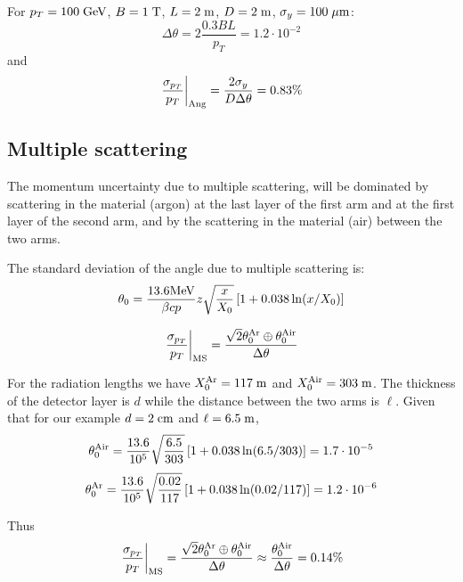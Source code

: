 \documentclass[a4paper,11pt,twoside]{article}
\begin{document}
For $p_T=100\;{\rm GeV}$, $B=1\;{\rm T}$, $L=2\;{\rm m}$, $D=2\;{\rm m}$, $\sigma_y=100\;{\rm \mu m}$:
\begin{equation}
  \Delta\theta = 2\frac{0.3BL}{p_T}=1.2\cdot 10^{-2}
\end{equation}
and
\begin{equation}
  \left.\frac{\sigma_{p_T}}{p_T}\right|_{\rm Ang}= \frac{2\sigma_y}{D\Delta\theta}=0.83\%
\end{equation}

\subsection{Multiple scattering}
The momentum uncertainty due to multiple scattering, will be dominated
by scattering in the material (argon) at the last layer of the first
arm and at the first layer of the second arm, and by the scattering in
the material (air) between the two arms.

The standard deviation of the angle due to multiple scattering is:
\begin{equation}
  \theta_0 = \frac{13.6{\rm MeV}}{\beta c p}z\sqrt{\frac{x}{X_0}}\left[1+0.038\ln(x/X_0)\right]
\end{equation}

\begin{equation}
  \left.\frac{\sigma_{p_T}}{p_T}\right|_{\rm MS}= \frac{\sqrt{2}\theta^{\rm Ar}_0\oplus \theta^{\rm Air}_0}{\Delta\theta}
\end{equation}



For the radiation lengths we have $X_0^{\rm Ar}=117\;{\rm m}$ and $X_0^{\rm Air}=303\;{\rm m}$.
The thickness of the detector layer is $d$ while the distance between the two arms is $\ell$.
Given that for our example $d=2\;{\rm cm}$ and $\ell=6.5\;{\rm m}$,
\begin{equation}
\theta^{\rm Air}_{0} = \frac{13.6}{10^5}\sqrt{\frac{6.5}{303}}\left[1+0.038\ln(6.5/303)\right]=  1.7\cdot 10^{-5}
\end{equation}
\begin{equation}
\theta^{\rm Ar}_{0} = \frac{13.6}{10^5}\sqrt{\frac{0.02}{117}}\left[1+0.038\ln(0.02/117)\right]=  1.2\cdot 10^{-6}
\end{equation}

Thus
\begin{equation}
  \left.\frac{\sigma_{p_T}}{p_T}\right|_{\rm MS}= \frac{\sqrt{2}\theta^{\rm Ar}_0\oplus \theta^{\rm Air}_0}{\Delta\theta}\approx
  \frac{\theta^{\rm Air}_0}{\Delta\theta}= 0.14\%
\end{equation}
\end{document}
